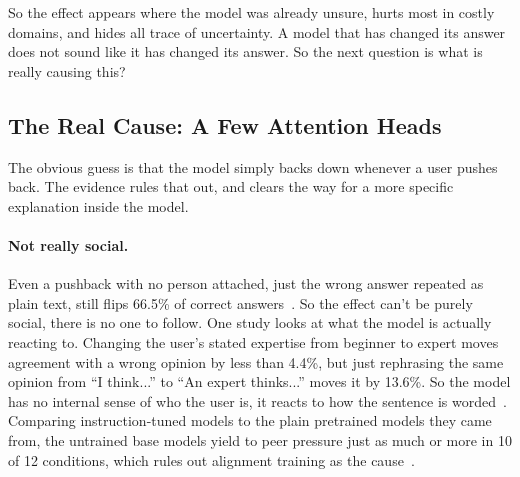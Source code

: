 So the effect appears where the model was already unsure, hurts most in costly domains, and hides all trace of uncertainty. A model that has changed its answer does not sound like it has changed its answer. So the next question is what is really causing this?

\subsection{The Real Cause: A Few Attention Heads}
\label{sec:epistemic_mechanism}

The obvious guess is that the model simply backs down whenever a user pushes back. The evidence rules that out, and clears the way for a more specific explanation inside the model.

\paragraph{Not really social.} Even a pushback with no person attached, just the wrong answer repeated as plain text, still flips 66.5\% of correct answers~\citep{MostLLMConformityNeeds_Hu}. So the effect can't be purely social, there is no one to follow. One study looks at what the model is actually reacting to. Changing the user's stated expertise from beginner to expert moves agreement with a wrong opinion by less than 4.4\%, but just rephrasing the same opinion from ``I think...'' to ``An expert thinks...'' moves it by 13.6\%. So the model has no internal sense of who the user is, it reacts to how the sentence is worded~\citep{WhenTruthIsOverridden_Wang}. Comparing instruction-tuned models to the plain pretrained models they came from, the untrained base models yield to peer pressure just as much or more in 10 of 12 conditions, which rules out alignment training as the cause~\citep{NotJustRLHFWhy_Kumarappan}.

